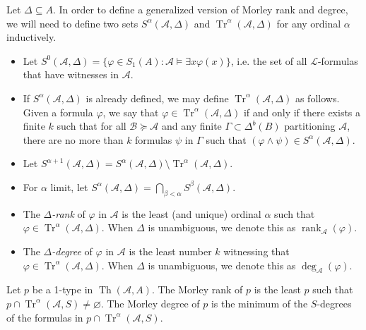 \documentclass{article}
\DeclareMathOperator{\Th}{Th}
\DeclareMathOperator{\Tr}{Tr}
\DeclareMathOperator{\rank}{rank}
\let\mc\mathcal
\begin{document}
\begin{definition}
    Let $\Delta \subseteq A$. In order to define a generalized version of Morley rank and degree, we will need to define two sets $S^{\alpha}(\mc{A}, \Delta)$ and $\Tr^{\alpha}(\mc{A}, \Delta)$ for any ordinal $\alpha$ inductively.
    \begin{itemize}
        \item Let $S^{0}(\mc{A}, \Delta) = \{ \varphi \in S_1(A) : \mc{A} \vDash \exists x \varphi(x) \}$, i.e. the set of all $\mc{L}$-formulas that have witnesses in $\mc{A}$.

        \item If $S^{\alpha}(\mc{A}, \Delta)$ is already defined, we may define $\Tr^{\alpha}(\mc{A}, \Delta)$ as follows. Given a formula $\varphi$, we say that $\varphi \in \Tr^{\alpha}(\mc{A}, \Delta)$ if and only if there exists a finite $k$ such that for all $\mc{B} \succeq \mc{A}$ and any finite $\Gamma \subset \Delta^{b}(B)$ partitioning $\mc{A}$, there are no more than $k$ formulas $\psi$ in $\Gamma$ such that $(\varphi \land \psi) \in S^{\alpha}(\mc{A}, \Delta)$.
        
        \item Let $S^{\alpha+1}(\mc{A}, \Delta) = S^{\alpha}(\mc{A}, \Delta) \setminus \Tr^{\alpha}(\mc{A}, \Delta)$.

        \item For $\alpha$ limit, let $S^{\alpha}(\mc{A}, \Delta) = \bigcap_{\beta < \alpha} S^{\beta}(\mc{A}, \Delta)$.

        \item The \textit{$\Delta$-rank} of $\varphi$ in $\mc{A}$ is the least (and unique) ordinal $\alpha$ such that $\varphi \in \Tr^{\alpha}(\mc{A}, \Delta)$. When $\Delta$ is unambiguous, we denote this as $\rank_{\mc{A}}(\varphi)$.
        
        \item The \textit{$\Delta$-degree} of $\varphi$ in $\mc{A}$ is the least number $k$ witnessing that $\varphi \in \Tr^{\alpha}(\mc{A}, \Delta)$. When $\Delta$ is unambiguous, we denote this as $\deg_{\mc{A}}(\varphi)$.
    \end{itemize}
\end{definition}

\begin{proposition}\label{dRank}
    Let $p$ be a 1-type in $\Th(\mc{A}, A)$. The Morley rank of $p$ is the least $p$ such that $p \cap \Tr^{\alpha}(\mc{A}, S) \neq \varnothing$. The Morley degree of $p$ is the minimum of the $S$-degrees of the formulas in $p \cap \Tr^{\alpha}(\mc{A}, S)$.
\end{proposition}
\end{document}
